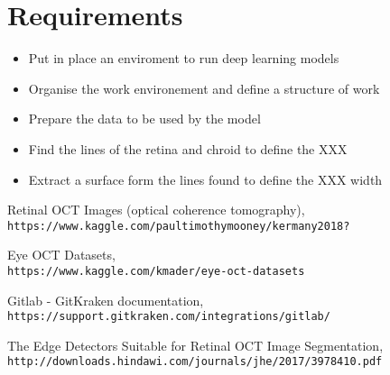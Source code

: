 \documentclass[12pt,a4paper]{scrartcl}
\begin{document}
\section{Requirements}\label{Requirements}


\begin{itemize}
  \item Put in place an enviroment to run deep learning models
  \item Organise the work environement and define a structure of work
  \item Prepare the data to be used by the model
  \item Find the lines of the retina and chroid to define the XXX
  \item Extract a surface form the lines found to define the XXX width
\end{itemize}


\newpage
\begin{thebibliography}{9}

Retinal OCT Images (optical coherence tomography),
\\\texttt{https://www.kaggle.com/paultimothymooney/kermany2018?}

Eye OCT Datasets,
\\\texttt{https://www.kaggle.com/kmader/eye-oct-datasets}

Gitlab - GitKraken documentation,
\\\texttt{https://support.gitkraken.com/integrations/gitlab/}

The Edge Detectors Suitable for Retinal OCT Image Segmentation,
\\\texttt{http://downloads.hindawi.com/journals/jhe/2017/3978410.pdf}

\end{thebibliography}
\end{document}
